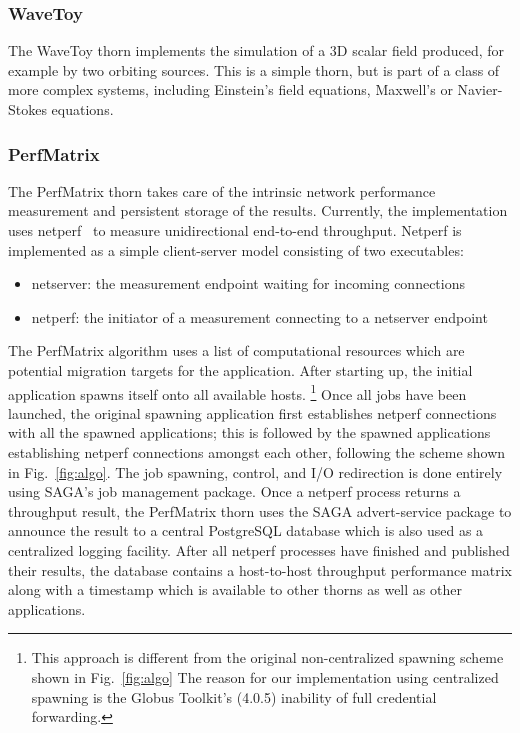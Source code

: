 \documentclass[conference,final]{IEEEtran}
\begin{document}
\subsubsection{WaveToy} The WaveToy thorn implements the simulation of
a 3D scalar field produced, for example by two orbiting sources.  This
is a simple thorn, but is part of a class of more complex systems,
including Einstein's field equations, Maxwell's or Navier-Stokes
equations.

\subsubsection{PerfMatrix} The PerfMatrix thorn takes care of the
intrinsic network performance measurement and persistent storage of
the results. Currently, the implementation uses
netperf~\cite{netperf_web} to measure unidirectional end-to-end
throughput. Netperf is implemented as a simple client-server model
consisting of two executables:
\begin{itemize}
\item{netserver: the measurement endpoint waiting for incoming connections}
\item{netperf: the initiator of a measurement connecting to a netserver endpoint}
\end{itemize}

The PerfMatrix algorithm uses a list of computational resources which
are potential migration targets for the application. After starting
up, the initial application spawns itself onto all available hosts.
\footnote{This approach is different from the original non-centralized
  spawning scheme shown in Fig.~\ref{fig:algo} The reason for our
  implementation using centralized spawning is the Globus Toolkit's
  (4.0.5) inability of full credential forwarding.} Once all jobs have
been launched, the original spawning application first establishes
netperf connections with all the spawned applications; this is
followed by the spawned applications establishing netperf connections
amongst each other, following the scheme shown in Fig.~\ref{fig:algo}.
The job spawning, control, and I/O redirection is done entirely using
SAGA's job management package.  Once a netperf process returns a
throughput result, the PerfMatrix thorn uses the SAGA advert-service
package to announce the result to a central PostgreSQL database which
is also used as a centralized logging facility. After all netperf
processes have finished and published their results, the database
contains a host-to-host throughput performance matrix along with a
timestamp which is available to other thorns as well as other
applications.
\end{document}
